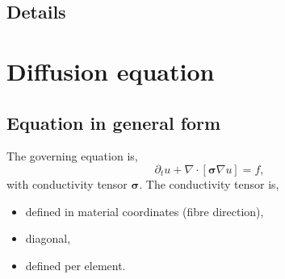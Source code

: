 \documentclass[
10pt, %
a4paper, %
oneside, %
headinclude,footinclude, %
BCOR5mm, %
]{scrartcl}
\begin{document}
\subsection{Details}
%

%
%
\clearpage
%

%
%

%
%
\clearpage
%
\section{Diffusion equation}
%
\subsection{Equation in general form}
%
The governing equation is,
%
\begin{equation}
    \partial_t u + \nabla \cdot [\boldsymbol{\sigma} \nabla u] = f,
\end{equation}
%
with conductivity tensor $\boldsymbol{\sigma}$. The conductivity tensor is,
%
\begin{itemize}
    \item{defined in material coordinates (fibre direction),}
    \item{diagonal,}
    \item{defined per element.}
\end{itemize}
%

%

%

%

%

%
%
%

%

%

%
%
\clearpage
%
\end{document}
